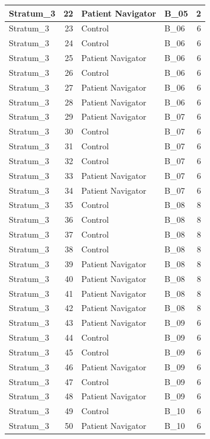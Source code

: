 \documentclass[
]{book}
\begin{document}
\begin{table}[H]
\begin{tabular}{l|r|l|l|r}
\hline
Stratum\_3 & 22 & Patient Navigator & B\_05 & 2\\
\hline
Stratum\_3 & 23 & Control & B\_06 & 6\\
\hline
Stratum\_3 & 24 & Control & B\_06 & 6\\
\hline
Stratum\_3 & 25 & Patient Navigator & B\_06 & 6\\
\hline
Stratum\_3 & 26 & Control & B\_06 & 6\\
\hline
Stratum\_3 & 27 & Patient Navigator & B\_06 & 6\\
\hline
Stratum\_3 & 28 & Patient Navigator & B\_06 & 6\\
\hline
Stratum\_3 & 29 & Patient Navigator & B\_07 & 6\\
\hline
Stratum\_3 & 30 & Control & B\_07 & 6\\
\hline
Stratum\_3 & 31 & Control & B\_07 & 6\\
\hline
Stratum\_3 & 32 & Control & B\_07 & 6\\
\hline
Stratum\_3 & 33 & Patient Navigator & B\_07 & 6\\
\hline
Stratum\_3 & 34 & Patient Navigator & B\_07 & 6\\
\hline
Stratum\_3 & 35 & Control & B\_08 & 8\\
\hline
Stratum\_3 & 36 & Control & B\_08 & 8\\
\hline
Stratum\_3 & 37 & Control & B\_08 & 8\\
\hline
Stratum\_3 & 38 & Control & B\_08 & 8\\
\hline
Stratum\_3 & 39 & Patient Navigator & B\_08 & 8\\
\hline
Stratum\_3 & 40 & Patient Navigator & B\_08 & 8\\
\hline
Stratum\_3 & 41 & Patient Navigator & B\_08 & 8\\
\hline
Stratum\_3 & 42 & Patient Navigator & B\_08 & 8\\
\hline
Stratum\_3 & 43 & Patient Navigator & B\_09 & 6\\
\hline
Stratum\_3 & 44 & Control & B\_09 & 6\\
\hline
Stratum\_3 & 45 & Control & B\_09 & 6\\
\hline
Stratum\_3 & 46 & Patient Navigator & B\_09 & 6\\
\hline
Stratum\_3 & 47 & Control & B\_09 & 6\\
\hline
Stratum\_3 & 48 & Patient Navigator & B\_09 & 6\\
\hline
Stratum\_3 & 49 & Control & B\_10 & 6\\
\hline
Stratum\_3 & 50 & Patient Navigator & B\_10 & 6\\

\end{tabular}
\end{table}
\end{document}
